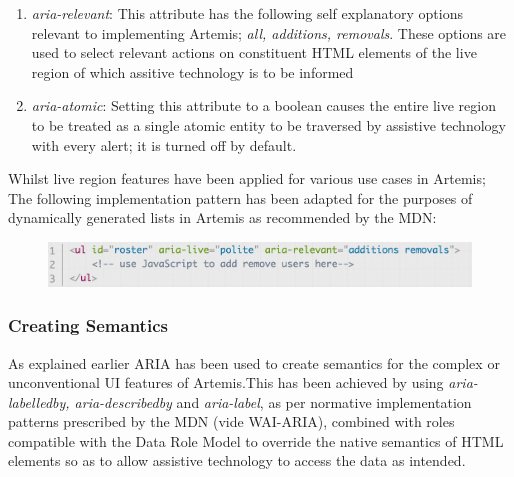 \begin{enumerate}
\begin{enumerate}
\begin{enumerate}
    \item \textit{aria-relevant}: This attribute has the following self explanatory options relevant to implementing Artemis; \textit{all, additions, removals}. These options are used to select relevant actions on constituent HTML elements of the live region of which assitive technology is to be informed 
    
    \item \textit{aria-atomic}: Setting this attribute to  a boolean  causes the entire live region to be treated as a single atomic entity to be traversed by assistive technology with every alert; it is turned off by default.
    
    \end{enumerate}

    Whilst live region features have been applied for various use cases in Artemis; The following implementation pattern has been adapted for the purposes of dynamically generated  lists in Artemis  as recommended by the MDN:
    
    \begin{figure}[h]
    	\includegraphics[scale=0.55,right]{chapters/appendices/figures/patternLive.png}
    	\label{ariaHidden}
    \end{figure}
    
    
    
\end{enumerate}
\end{enumerate}




\subsubsection{Creating Semantics}

As explained earlier ARIA has been used to create semantics for the complex or unconventional UI features of Artemis.This has been achieved by  using \textit{aria-labelledby, aria-describedby} and \textit{aria-label}, as per normative implementation patterns prescribed by the MDN (vide WAI-ARIA), combined with roles compatible with the Data Role Model to override the native semantics of HTML elements so as to allow assistive technology to access the data as intended.

